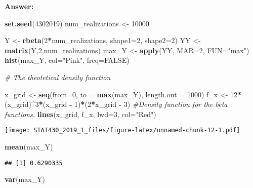 \documentclass[]{article}
\newenvironment{Shaded}{\begin{snugshade}}{\end{snugshade}}
\newcommand{\KeywordTok}[1]{\textcolor[rgb]{0.13,0.29,0.53}{\textbf{#1}}}
\newcommand{\DataTypeTok}[1]{\textcolor[rgb]{0.13,0.29,0.53}{#1}}
\newcommand{\DecValTok}[1]{\textcolor[rgb]{0.00,0.00,0.81}{#1}}
\newcommand{\StringTok}[1]{\textcolor[rgb]{0.31,0.60,0.02}{#1}}
\newcommand{\CommentTok}[1]{\textcolor[rgb]{0.56,0.35,0.01}{\textit{#1}}}
\newcommand{\OtherTok}[1]{\textcolor[rgb]{0.56,0.35,0.01}{#1}}
\newcommand{\OperatorTok}[1]{\textcolor[rgb]{0.81,0.36,0.00}{\textbf{#1}}}
\newcommand{\NormalTok}[1]{#1}
\begin{document}
\textbf{Answer:}

\begin{Shaded}
\begin{Highlighting}[]
\KeywordTok{set.seed}\NormalTok{(}\DecValTok{4302019}\NormalTok{)}
\NormalTok{num_realizations <-}\StringTok{ }\DecValTok{10000}

\NormalTok{Y <-}\StringTok{ }\KeywordTok{rbeta}\NormalTok{(}\DecValTok{2}\OperatorTok{*}\NormalTok{num_realizations, }\DataTypeTok{shape1=}\DecValTok{2}\NormalTok{, }\DataTypeTok{shape2=}\DecValTok{2}\NormalTok{)}
\NormalTok{YY <-}\StringTok{ }\KeywordTok{matrix}\NormalTok{(Y,}\DecValTok{2}\NormalTok{,num_realizations)}
\NormalTok{max_Y <-}\StringTok{ }\KeywordTok{apply}\NormalTok{(YY, }\DataTypeTok{MAR=}\DecValTok{2}\NormalTok{, }\DataTypeTok{FUN=}\StringTok{"max"}\NormalTok{)}
\KeywordTok{hist}\NormalTok{(max_Y, }\DataTypeTok{col=}\StringTok{"Pink"}\NormalTok{, }\DataTypeTok{freq=}\OtherTok{FALSE}\NormalTok{)}

\CommentTok{# The theotetical density function}

\NormalTok{x_grid <-}\StringTok{ }\KeywordTok{seq}\NormalTok{(}\DataTypeTok{from=}\DecValTok{0}\NormalTok{, }\DataTypeTok{to =} \KeywordTok{max}\NormalTok{(max_Y), }\DataTypeTok{length.out =} \DecValTok{1000}\NormalTok{)}
\NormalTok{f_x <-}\StringTok{ }\DecValTok{12}\OperatorTok{*}\NormalTok{(x_grid)}\OperatorTok{^}\DecValTok{3}\OperatorTok{*}\NormalTok{(x_grid }\OperatorTok{-}\StringTok{ }\DecValTok{1}\NormalTok{)}\OperatorTok{*}\NormalTok{(}\DecValTok{2}\OperatorTok{*}\NormalTok{x_grid }\OperatorTok{-}\StringTok{ }\DecValTok{3}\NormalTok{) }\CommentTok{#Density function for the beta functions.}
\KeywordTok{lines}\NormalTok{(x_grid, f_x, }\DataTypeTok{lwd=}\DecValTok{3}\NormalTok{, }\DataTypeTok{col=}\StringTok{"Red"}\NormalTok{)}
\end{Highlighting}
\end{Shaded}

\texttt{[image: STAT430\_2019\_1\_files/figure-latex/unnamed-chunk-12-1.pdf]}

\begin{Shaded}
\begin{Highlighting}[]
\KeywordTok{mean}\NormalTok{(max_Y)}
\end{Highlighting}
\end{Shaded}

\begin{verbatim}
## [1] 0.6290335
\end{verbatim}

\begin{Shaded}
\begin{Highlighting}[]
\KeywordTok{var}\NormalTok{(max_Y)}
\end{Highlighting}
\end{Shaded}
\end{document}
